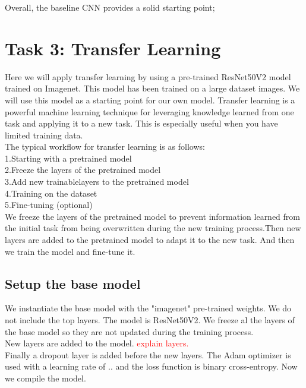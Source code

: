 \documentclass[conference]{IEEEtran}
\begin{document}
Overall, the baseline CNN provides a solid starting point;




\section{Task 3: Transfer Learning} \label{sec:task_3}
Here we will apply transfer learning by using a pre-trained ResNet50V2 model trained on Imagenet. This model has been trained on a large dataset images. We will use this model as a starting point for our own model. Transfer learning is a powerful machine learning technique for leveraging knowledge learned
from one task and applying it to a new task. This is especially useful when you have limited training data. \\

The typical workflow for transfer learning is as follows: \\
1.Starting with a pretrained model\\
2.Freeze the layers of the pretrained model\\
3.Add new trainablelayers to the pretrained model\\
4.Training on the dataset\\
5.Fine-tuning (optional)\\

We freeze the layers of the pretrained model to prevent information learned from the initial task from being overwritten during the new training process.Then new layers are added to the pretrained model to adapt it to the new task. And then we train the model and fine-tune it.\\

\subsection{Setup the base model}
We instantiate the base model with the "imagenet" pre-trained weights. We do not include the top layers. The model is ResNet50V2. We freeze al the layers of the base model so they are not updated during the training process.\\

New layers are added to the model. \textcolor{red}{explain layers.}\\

Finally a dropout layer is added before the new layers.
The Adam optimizer is used with a learning rate of .. and the loss function is binary cross-entropy.
Now we compile the model. \\
\end{document}
